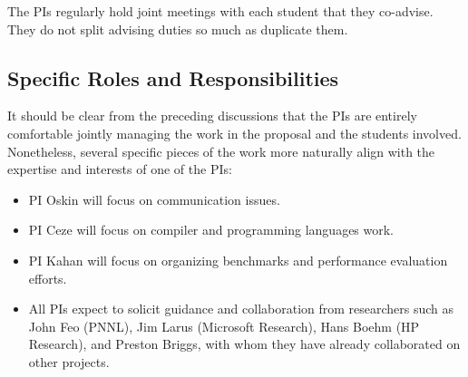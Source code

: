 The PIs regularly hold joint meetings with each student that they
co-advise.  They do not split advising duties so much as duplicate
them.

\subsection*{Specific Roles and Responsibilities}

It should be clear from the preceding discussions that the PIs are
entirely comfortable jointly managing the work in the proposal and the
students involved.  Nonetheless, several specific pieces of the work
more naturally align with the expertise and interests of one of the
PIs:

\begin{itemize}
\item PI Oskin will focus on communication issues. 
\item PI Ceze will focus on compiler and programming languages work.
\item PI Kahan will focus on organizing benchmarks and performance evaluation efforts.
\item All PIs expect to solicit guidance and collaboration from
  researchers such as John Feo (PNNL), Jim Larus (Microsoft Research), Hans
  Boehm (HP Research), and Preston Briggs,  with whom
  they have already collaborated on other projects.
\end{itemize}





